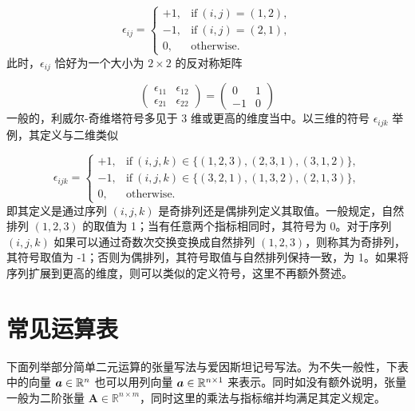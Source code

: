\documentclass{article}
\begin{document}
\[\epsilon_{ij} = \begin{cases}
        +1, & \text{if}\ (i, j) = (1, 2), \\
        -1, & \text{if}\ (i, j) = (2, 1), \\
        0,  & \text{otherwise.}
    \end{cases}\]
此时，$\epsilon_{ij}$ 恰好为一个大小为 $2\times2$ 的反对称矩阵

\[
    \begin{pmatrix}
        \epsilon_{11} & \epsilon_{12} \\ \epsilon_{21} & \epsilon_{22}
    \end{pmatrix}
    = \begin{pmatrix}
        0 & 1 \\ -1 & 0
    \end{pmatrix}
\]
一般的，利威尔-奇维塔符号多见于 3 维或更高的维度当中。以三维的符号
$\epsilon_{ijk}$ 举例，其定义与二维类似

\[\epsilon_{ijk} = \begin{cases}
        +1, & \text{if}\ (i, j, k) \in \bigl\{(1, 2, 3), (2, 3, 1), (3, 1, 2)\bigr\}, \\
        -1, & \text{if}\ (i, j, k) \in \bigl\{(3, 2, 1), (1, 3, 2), (2, 1, 3)\bigr\}, \\
        0,  & \text{otherwise.}
    \end{cases}\]
即其定义是通过序列 $(i, j, k)$
是奇排列还是偶排列定义其取值。一般规定，自然排列 $(1, 2, 3)$ 的取值为
1；当有任意两个指标相同时，其符号为 0。对于序列 $(i, j, k)$
如果可以通过奇数次交换变换成自然排列
$(1, 2, 3)$，则称其为奇排列，其符号取值为
-1；否则为偶排列，其符号取值与自然排列保持一致，为
1。如果将序列扩展到更高的维度，则可以类似的定义符号，这里不再额外赘述。


\section{常见运算表}
下面列举部分简单二元运算的张量写法与爱因斯坦记号写法。为不失一般性，下表中的向量
${\bm a} \in {\mathbb R}^{n}$ 也可以用列向量
${\bm a} \in {\mathbb R}^{n \times 1}$
来表示。同时如没有额外说明，张量一般为二阶张量
${\bm A} \in {\mathbb R}^{n \times m}$，同时这里的乘法与指标缩并均满足其定义规定。
\end{document}
